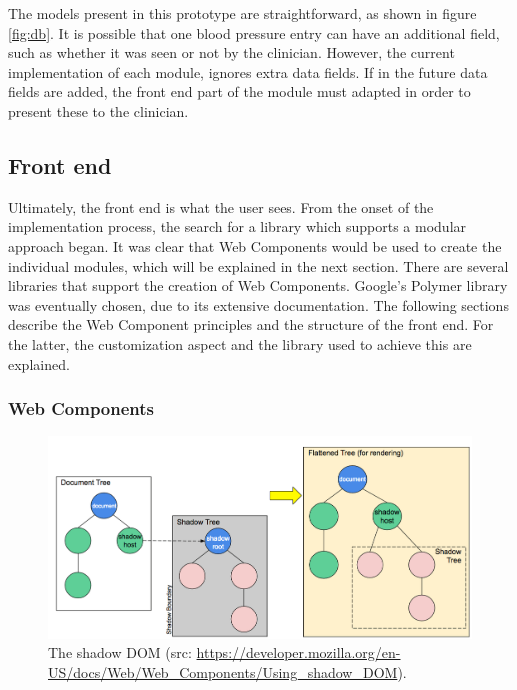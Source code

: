        The models present in this prototype are straightforward, as shown in figure \ref{fig:db}. It is possible that one blood pressure entry can have an additional field, such as whether it was seen or not by the clinician. However, the current implementation of each module, ignores extra data fields. If in the future data fields are added, the front end part of the module must adapted in order to present these to the clinician.

    \subsection{Front end}

    Ultimately, the front end is what the user sees. From the onset of the implementation process, the search for a library which supports a modular approach began. It was clear that Web Components would be used to create the individual modules, which will be explained in the next section. There are several libraries that support the creation of Web Components. Google's Polymer library was eventually chosen, due to its extensive documentation. The following sections describe the Web Component principles and the structure of the front end. For the latter, the customization aspect and the library used to achieve this are explained.

        \subsubsection{Web Components}
        
        \begin{figure}[!t]
            \centering
            \includegraphics[width=1.0\textwidth]{chapters/4_implementation/shadow-dom}
            \caption{The shadow DOM (src: \url{https://developer.mozilla.org/en-US/docs/Web/Web_Components/Using_shadow_DOM}).}\label{fig:shadow_dom}
        \end{figure}

